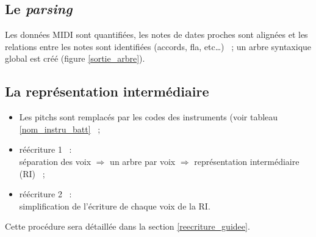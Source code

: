 %

\subsection*{Le \textit{parsing}}
Les données MIDI sont quantifiées, les notes de dates proches sont alignées et
les relations entre les notes sont identifiées (accords, fla, etc…)~ ; un arbre
syntaxique global est créé (figure \ref{sortie_arbre}). 

\subsection*{La représentation intermédiaire}
\label{regles}
\begin{itemize}
    \item Les pitchs sont remplacés par les codes des instruments (voir tableau
    \ref{nom_instru_batt}~ ;
    \item réécriture 1~ :\\
    séparation des voix $\Rightarrow$ un arbre par voix
    $\Rightarrow$ représentation intermédiaire (RI)~ ;
    \item réécriture 2~ :\\
    simplification de l’écriture de chaque voix de la RI.\\
\end{itemize}
Cette procédure sera détaillée dans la section \ref{reecriture_guidee}.
